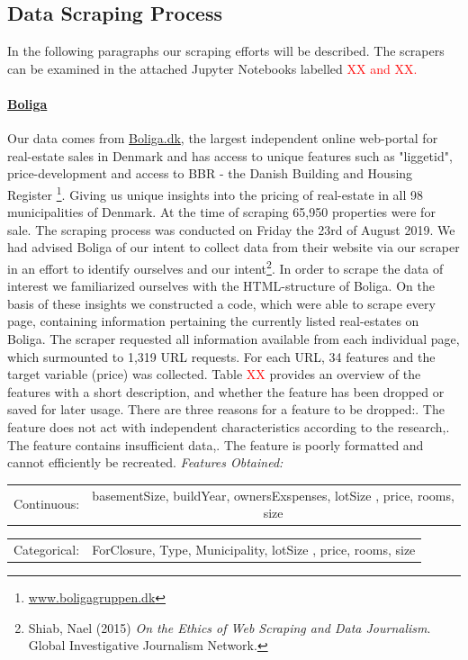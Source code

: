 \documentclass[12pt,a4paper]{article}
\begin{document}
\subsection{Data Scraping Process}
In the following paragraphs our scraping efforts will be described. The scrapers can be examined in the attached Jupyter Notebooks labelled \textcolor{red}{XX and XX.} 
\paragraph{\href{https://www.boliga.dk}{Boliga}\newline}
Our data comes from \href{https://www.boliga.dk}{Boliga.dk}, the largest independent online web-portal for real-estate sales in Denmark and has access to unique features such as "liggetid", price-development and access to BBR - the Danish Building and Housing Register \footnote{\href{https://www.boligagruppen.dk}{www.boligagruppen.dk}}. Giving us unique insights into the pricing of real-estate in all 98 municipalities of Denmark. At the time of scraping 65,950 properties were for sale.\newline
The scraping process was conducted on Friday the 23rd of August 2019. We had advised Boliga of our intent to collect data from their website via our scraper in an effort to identify ourselves and our intent\footnote{Shiab, Nael (2015) \textit{On the Ethics of Web Scraping and Data Journalism}. Global Investigative Journalism Network.}. In order to scrape the data of interest we familiarized ourselves with the HTML-structure of Boliga. On the basis of these insights we constructed a code, which were able to scrape every page, containing information pertaining the currently listed real-estates on Boliga. The scraper requested all information available from each individual page, which surmounted to 1,319 URL requests. \newline
For each URL, 34 features and the target variable (price) was collected. Table \textcolor{red}{XX} provides an overview of the features with a short description, and whether the feature has been dropped or saved for later usage. There are three reasons for a feature to be dropped:. The feature does not act with independent characteristics according to the research,. The feature contains insufficient data,. The feature is poorly formatted and cannot efficiently be recreated. 
\vspace*{10px} \newline
\textit{Features Obtained:} \newline
\begin{tabular}{c c}
Continuous: & basementSize, buildYear, ownersExspenses, lotSize	, price, rooms, size  \\	
\end{tabular}\newline 
\begin{tabular}{c c}
Categorical: & ForClosure, Type, Municipality, lotSize	, price, rooms, size  \\	
\end{tabular}
\end{document}
